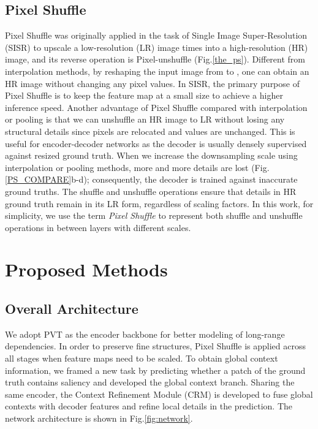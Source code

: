 \documentclass[letterpaper]{article} \usepackage{aaai22}  \usepackage{times}  \usepackage{helvet}  \usepackage{courier}  \usepackage[hyphens]{url}  \usepackage{graphicx} \urlstyle{rm} \def\UrlFont{\rm}  \usepackage{natbib}  \usepackage{caption} \DeclareCaptionStyle{ruled}{labelfont=normalfont,labelsep=colon,strut=off} \frenchspacing  \setlength{\pdfpagewidth}{8.5in}  \setlength{\pdfpageheight}{11in}  \usepackage{algorithm}
\begin{document}
\subsection{Pixel Shuffle}
Pixel Shuffle \cite{PS} was originally applied in the task of Single Image Super-Resolution (SISR) to upscale a low-resolution (LR) image  times into a high-resolution (HR) image, and its reverse operation is Pixel-unshuffle (Fig.\ref{the_ps}). Different from interpolation methods, by reshaping the input image from  to , one can obtain an HR image without changing any pixel values. In SISR, the primary purpose of Pixel Shuffle is to keep the feature map at a small size to achieve a higher inference speed. Another advantage of Pixel Shuffle compared with interpolation or pooling is that we can unshuffle an HR image to LR without losing any structural details since pixels are relocated and values are unchanged. This is useful for encoder-decoder networks as the decoder is usually densely supervised against resized ground truth. When we increase the downsampling scale using interpolation or pooling methods, more and more details are lost (Fig.\ref{PS_COMPARE}b-d); consequently, the decoder is trained against inaccurate ground truths. The shuffle and unshuffle operations ensure that details in HR ground truth remain in its LR form, regardless of scaling factors. In this work, for simplicity, we use the term \textit{Pixel Shuffle} to represent both shuffle and unshuffle operations in between layers with different scales.

\section{Proposed Methods}
\subsection{Overall Architecture}
We adopt PVT as the encoder backbone for better modeling of long-range dependencies. In order to preserve fine structures, Pixel Shuffle is applied across all stages when feature maps need to be scaled. To obtain global context information, we framed a new task by predicting whether a patch of the ground truth contains saliency and developed the global context branch. Sharing the same encoder, the Context Refinement Module (CRM) is developed to fuse global contexts with decoder features and refine local details in the prediction. The network architecture is shown in Fig.\ref{fig:network}.
\end{document}
